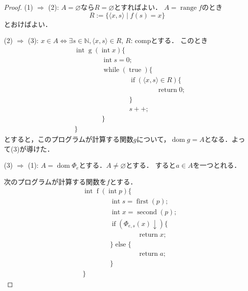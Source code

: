 \documentclass[uplatex]{jsarticle}
\newcommand{\N}{\mathbb{N}}
\newcommand{\range}{\operatorname{range}}
\newcommand{\dom}{\operatorname{dom}}
\theoremstyle{definition} %
\begin{document}
\begin{proof}
(1) $\Rightarrow$ (2): $A = \varnothing$なら$R= \varnothing$とすればよい．
$A = \range f$のとき
\[R := \{\langle x, s\rangle \mid f(s)=x\}\]
とおけばよい．

(2) $\Rightarrow$ (3): $x \in A \iff \exists s \in \N, \langle x, s \rangle \in R$, $R$: compとする．
このとき
\begin{align*}
&\operatorname{int} \operatorname{g}(\operatorname{int} x) \{ \\
&\hspace{4em}\operatorname{int} s = 0; \\
&\hspace{4em}\operatorname{while} (\operatorname{true}) \{ \\
&\hspace{4em}\hspace{4em}\operatorname{if} (\langle x, s\rangle \in R) \{ \\
&\hspace{4em}\hspace{4em}\hspace{4em}\operatorname{return} 0; \\
&\hspace{4em}\hspace{4em}\} \\
&\hspace{4em}\hspace{4em}s ++; \\
&\hspace{4em}\} \\
&\}
\end{align*}
とすると，このプログラムが計算する関数$g$について，$\dom g=A$となる．よって(3)が導けた．

(3) $\Rightarrow$ (1): 
$A = \dom \Phi_e$とする．$A \neq \varnothing$とする．
すると$a \in A$を一つとれる．

次のプログラムが計算する関数を$f$とする．
\begin{align*}
&\operatorname{int} \operatorname{f}(\operatorname{int} p) \{ \\
&\hspace{4em}\operatorname{int} s = \operatorname{first}(p); \\
&\hspace{4em}\operatorname{int} x = \operatorname{second}(p); \\
&\hspace{4em}\operatorname{if} (\Phi_{e,s}(x)\downarrow) \{ \\
&\hspace{4em}\hspace{4em}\operatorname{return} x; \\
&\hspace{4em}\} \operatorname{else} \{ \\
&\hspace{4em}\hspace{4em}\operatorname{return} a; \\
&\hspace{4em}\} \\
&\}
\end{align*}


\end{proof}
\end{document}
